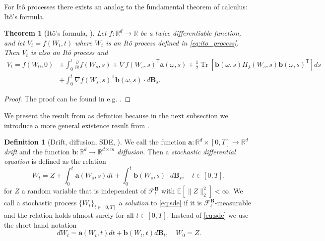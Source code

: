 \documentclass[12pt]{article}
\newtheorem{theorem}{Theorem}[section]
\theoremstyle{definition}
\newtheorem{definition}[definition]{Definition}
\numberwithin{equation}{section}
\newcommand{\R}{\mathbb{R}}
\newcommand{\CF}{\mathcal{F}}
\newcommand{\T}{\mathsf{T}}
\newcommand{\ev}[1]{\mathbb{E}\left[{#1}\right]}
\newcommand{\norm}[1]{\lVert{#1}\rVert_2}
\DeclareMathOperator{\Tr}{Tr}
\begin{document}
For Itô processes there exists an analog to the fundamental theorem of calculus: Itô's formula.
\begin{theorem}[Itô's formula, ]
  \label{thm:ito_formula}
  Let $f : \R^d \rightarrow \R$ be a twice differentiable function, and let $V_t = f(W_t, t)$ where $W_t$ is an Itô process defined in \eqref{eq:ito_process}. Then $V_t$ is also an Itô process and
  \begin{equation}
    \begin{split}
    V_t = f(W_0, 0) &+ \int_0^t \frac{\partial}{\partial t} f(W_s, s) + \nabla f(W_s, s)^\T \mathbf{a}(\omega,s)+ \frac{1}{2}\Tr\left[\mathbf{b}(\omega,s) H_f(W_s, s) \mathbf{b}(\omega,s)^\T\right]ds \\
    &+ \int_0^t \nabla f(W_s, s)^\T \mathbf{b}(\omega,s) \cdot d\mathbf{B}_s.
    \end{split}
  \end{equation}
\end{theorem}
\begin{proof}
  The proof can be found in e.g. \cite{baldiEquazioniDifferenzialiStocastiche2000}.
\end{proof}
We present the result from \cite[pp.~149]{eAppliedStochasticAnalysis2021} as defintion because in the next subsection we introduce a more general existence result from \cite{liStochasticModifiedEquations2019}.
\begin{definition}[Drift, diffusion, SDE, ]
  We call the function $\mathbf{a} : \R^d \times [0,T] \rightarrow \R^d$ \emph{drift} and the function $\mathbf{b} : \R^d \rightarrow \R^{d \times m}$ \emph{diffusion}. Then a \emph{stochastic differential equation} is defined as the relation
  \begin{equation}
    \label{eq:sde}
    W_t = Z + \int_0^t \mathbf{a}(W_s, s) dt + \int_0^t \mathbf{b}(W_s,s)\cdot d\mathbf{B}_s, \quad t \in [0,T],
  \end{equation}
  for $Z$ a random variable that is independent of $\CF_t^\mathbf{B}$ with $\ev{\norm{Z}^2} < \infty$.
  We call a stochastic process $\{W_t\}_{t \in [0,T]}$ a \emph{solution} to \eqref{eq:sde} if it is $\CF_t^\mathbf{B}$-measurable and the relation holds almost surely for all $t \in [0,T]$. Instead of \eqref{eq:sde} we use the short hand notation
  \begin{equation*}
    dW_t = \mathbf{a}(W_t,t)dt + \mathbf{b}(W_t,t)d\mathbf{B}_t, \quad W_0 = Z.
  \end{equation*}
\end{definition}
\end{document}
